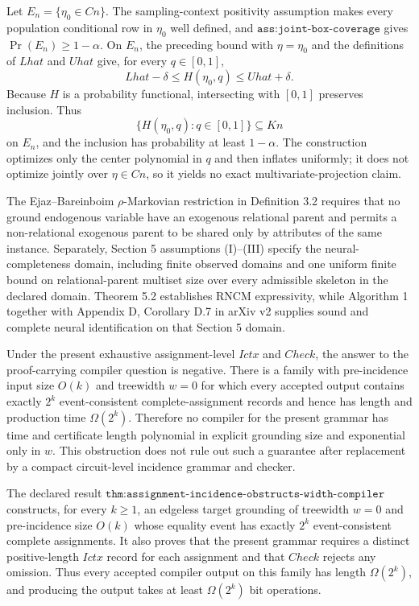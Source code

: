 Let \(E_n=\{\eta_0\in Cn\}\).  The sampling-context positivity assumption makes every population conditional row in \(\eta_0\) well defined, and \(\texttt{ass:joint-box-coverage}\) gives \(\Pr(E_n)\geq1-\alpha\).  On \(E_n\), the preceding bound with \(\eta=\eta_0\) and the definitions of \(Lhat\) and \(Uhat\) give, for every \(q\in[0,1]\),
\[
 Lhat-\delta\leq H(\eta_0,q)\leq Uhat+\delta.
\]
Because \(H\) is a probability functional, intersecting with \([0,1]\) preserves inclusion.  Thus
\[
 \{H(\eta_0,q):q\in[0,1]\}\subseteq Kn
\]
on \(E_n\), and the inclusion has probability at least \(1-\alpha\).  The construction optimizes only the center polynomial in \(q\) and then inflates uniformly; it does not optimize jointly over \(\eta\in Cn\), so it yields no exact multivariate-projection claim.

The Ejaz--Bareinboim \(\rho\)-Markovian restriction in Definition 3.2 requires that no ground endogenous variable have an exogenous relational parent and permits a non-relational exogenous parent to be shared only by attributes of the same instance.  Separately, Section 5 assumptions (I)--(III) specify the neural-completeness domain, including finite observed domains and one uniform finite bound on relational-parent multiset size over every admissible skeleton in the declared domain.  Theorem 5.2 establishes RNCM expressivity, while Algorithm 1 together with Appendix D, Corollary D.7 in arXiv v2 supplies sound and complete neural identification on that Section 5 domain.

Under the present exhaustive assignment-level \(Ictx\) and \(Check\), the answer to the proof-carrying compiler question is negative.  There is a family with pre-incidence input size \(O(k)\) and treewidth \(w=0\) for which every accepted output contains exactly \(2^k\) event-consistent complete-assignment records and hence has length and production time \(\Omega(2^k)\).  Therefore no compiler for the present grammar has time and certificate length polynomial in explicit grounding size and exponential only in \(w\).  This obstruction does not rule out such a guarantee after replacement by a compact circuit-level incidence grammar and checker.

The declared result \(\texttt{thm:assignment-incidence-obstructs-width-compiler}\) constructs, for every \(k\geq1\), an edgeless target grounding of treewidth \(w=0\) and pre-incidence size \(O(k)\) whose equality event has exactly \(2^k\) event-consistent complete assignments.  It also proves that the present grammar requires a distinct positive-length \(Ictx\) record for each assignment and that \(Check\) rejects any omission.  Thus every accepted compiler output on this family has length \(\Omega(2^k)\), and producing the output takes at least \(\Omega(2^k)\) bit operations.

